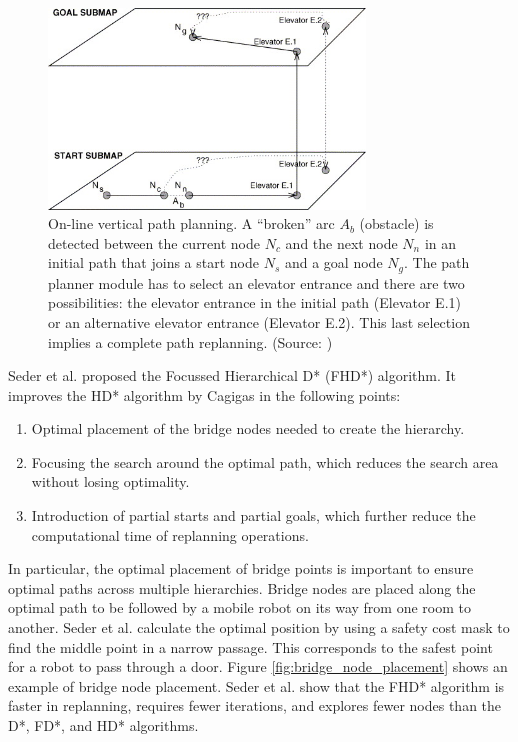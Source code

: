 \begin{figure}[h]
    \centering
    \includegraphics[width=0.75\textwidth]{figures/20_state_of_the_art/elevator_selection_problem.jpg}
    \caption[The elevator selection problem]{On-line vertical path planning. A “broken” arc \(A_b\) (obstacle) is detected between the current node \(N_c\) and the next node \(N_n\) in an initial path that joins a start node \(N_s\) and a goal node \(N_g\). The path planner module has to select an elevator entrance and there are two possibilities: the elevator entrance in the initial path (Elevator E.1) or an alternative elevator entrance (Elevator E.2). This last selection implies a complete path replanning. (Source: \cite{cagigas_hierarchical_2005})}
    \label{fig:elevator_selection_problem}
\end{figure}


Seder et al. \cite{seder_hierarchical_2011} proposed the Focussed Hierarchical D* (FHD*) algorithm. It improves the HD* algorithm by Cagigas in the following points:
\begin{enumerate}
\item Optimal placement of the bridge nodes needed to create the hierarchy.
    \item Focusing the search around the optimal path, which reduces the search area without losing optimality.
\item Introduction of partial starts and partial goals, which further reduce the computational time of replanning operations.
\end{enumerate}

In particular, the optimal placement of bridge points is important to ensure optimal paths across multiple hierarchies. Bridge nodes are placed along the optimal path to be followed by a mobile robot on its way from one room to another. Seder et al. calculate the optimal position by using a safety cost mask to find the middle point in a narrow passage. This corresponds to the safest point for a robot to pass through a door. Figure \ref{fig:bridge_node_placement} shows an example of bridge node placement. Seder et al. show that the FHD* algorithm is faster in replanning, requires fewer iterations, and explores fewer nodes than the D*, FD*, and HD* algorithms.

